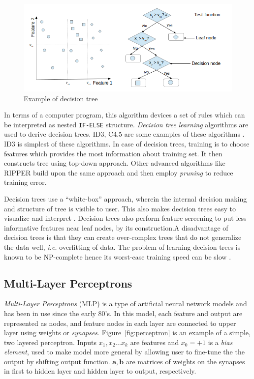 \begin{figure}[h]
  \begin{center}
    \captionsetup{justification=centering}
    \includegraphics[scale=0.65]{figures/desctree.png}
    \caption{Example of decision tree}
    \label{fig:desctree}
  \end{center}
\end{figure}

In terms of a computer program, this algorithm devices a set of rules which can be interpreted as nested \texttt{IF-ELSE} structure. \emph{Decision tree learning} algorithms are used to derive decision trees. ID3, C4.5 are some examples of these algorithms \cite{Mitchell1997}. ID3 \cite{Quinlan1986} is simplest of these algorithms. In case of decision trees, training is to choose features which provides the most information about training set. It then constructs tree using top-down approach. Other advanced algorithms like RIPPER \cite{Cohen1995} build upon the same approach and then employ \emph{pruning} to reduce training error.

Decision trees use a \enquote{white-box} approach, wherein the internal decision making and structure of tree is visible to user. This also makes decision trees easy to visualize and interpret \cite{Kotsiantis2013}. Decision trees also perform feature screening to put less informative features near leaf nodes, by its construction.A disadvantage of decision trees is that they can create over-complex trees that do not generalize the data well, \emph{i.e.} overfitting of data. The problem of learning decision trees is known to be NP-complete hence its worst-case training speed can be slow \cite{Hyafil1976}.

\subsection{Multi-Layer Perceptrons}
\emph{Multi-Layer Perceptrons} (MLP) is a type of artificial neural network models and has been in use since the early 80's. In this model, each feature and output are represented as nodes, and feature nodes in each layer are connected to upper layer using weights or \emph{synapses}. Figure~\ref{fig:perceptron} is an example of a simple, two layered perceptron. Inputs $x_1, x_2 \ldots x_k$ are features and $x_0 = +1$ is a \emph{bias element}, used to make model more general by allowing user to fine-tune the the output by shifting output function. $\boldsymbol{a,b}$ are matrices of weights on the synapses in first to hidden layer and hidden layer to output, respectively.

